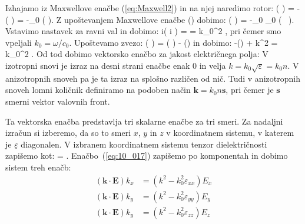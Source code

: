 Izhajamo iz Maxwellove enačbe (\ref{eq:Maxwell2}) in na njej naredimo rotor:
\beq
\nabla \times \left( \nabla \times {} \right) = -  
\left( \nabla \times {} \right) = -\mu_0  
\left( \nabla \times {} \right).
\label{eq:10_012}
\eeq
Z upoštevanjem Maxwellove enačbe () dobimo:
\beq
\nabla \times \left( \nabla \times {} \right) = -\mu_0 \varepsilon_0 
 \left( \underline{\varepsilon}\, \right).
\label{eq:10_013}
\eeq
Vstavimo nastavek za ravni val in dobimo:
\beq
i\times \left( i  \times {}\right) = 
\underline{\varepsilon}  = 
k_0^2 \underline{\varepsilon} ,
\label{eq:10_014}
\eeq
pri čemer smo vpeljali $k_0 = \omega / c_0$. Upoštevamo zvezo:
\beq
{}\times\left( \times {}\right) = \left(\cdot 
{}\right)  - \left(\cdot {}\right) 
\label{eq:10_015}
\eeq
in dobimo:
\beq
-\left(\cdot {}\right) + k^2  = k_0^2 \underline{\varepsilon} .
\label{eq:10_016}
\eeq
Od tod dobimo vektorsko enačbo za jakost električnega polja:
V izotropni snovi je izraz na desni strani enačbe enak 0 in velja $k = k_0\sqrt{\varepsilon} = k_0 n$. V anizotropnih
snoveh pa je ta izraz na splošno različen od nič. Tudi v anizotropnih snoveh lomni količnik
definiramo na podoben način $\mathbf{k}= k_0 n \mathbf{s}$, pri čemer je $\mathbf{s}$ smerni vektor
valovnih front.

Ta vektorska enačba predstavlja tri skalarne enačbe za tri smeri. Za nadaljni izračun si izberemo,
da so to smeri $x$, $y$ in $z$ v koordinatnem sistemu, v katerem je $\underline{\varepsilon}$ diagonalen.
V izbranem koordinatnem sistemu tenzor dielektričnosti zapišemo kot:
\beq
\underline{\varepsilon} = 
\!\!.
\label{eq:10_018}
\eeq
Enačbo~(\ref{eq:10_017}) zapišemo po komponentah in dobimo sistem treh enačb:
\begin{align}
\left(\mathbf{k}\cdot \mathbf{E}\right) k_x &= \left( k^2 -k_0^2 \varepsilon_{xx}\right) E_x \\
\left(\mathbf{k}\cdot \mathbf{E}\right) k_y &= \left( k^2 -k_0^2 \varepsilon_{yy}\right) E_y \\
\left(\mathbf{k}\cdot \mathbf{E}\right) k_y &= \left( k^2 -k_0^2 \varepsilon_{zz}\right) E_z 
\label{eq:10_019}
\end{align}






